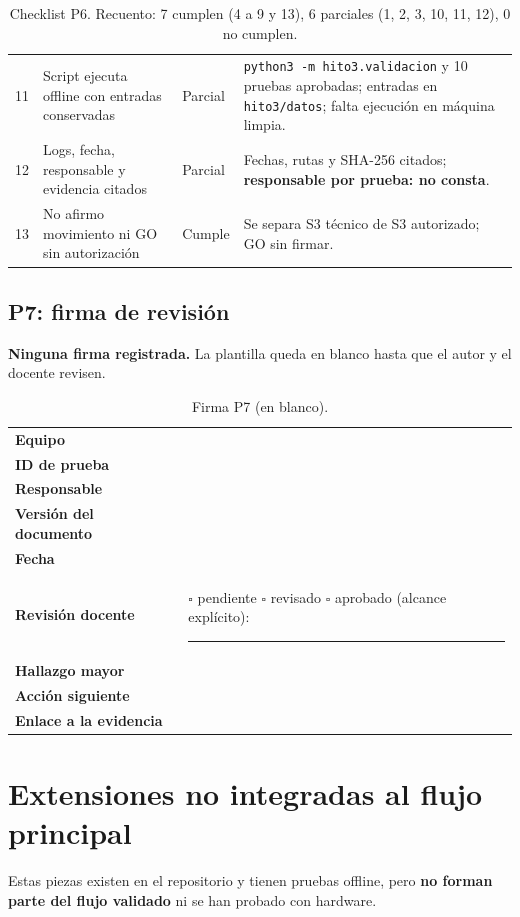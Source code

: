 \documentclass[10pt,a4paper]{article}
\begin{document}
\begin{table}[H]
\begin{tabularx}{\textwidth}{@{}r>{\raggedright\arraybackslash}p{4.6cm}>{\raggedright\arraybackslash}p{1.5cm}>{\raggedright\arraybackslash}X@{}}
11 & Script ejecuta offline con entradas conservadas & Parcial & \texttt{python3 -m hito3.validacion} y 10 pruebas aprobadas; entradas en \texttt{hito3/datos}; falta ejecución en máquina limpia.\\
12 & Logs, fecha, responsable y evidencia citados & Parcial & Fechas, rutas y SHA-256 citados; \textbf{responsable por prueba: no consta}.\\
13 & No afirmo movimiento ni GO sin autorización & Cumple & Se separa S3 técnico de S3 autorizado; GO sin firmar.\\
\bottomrule
\end{tabularx}
\caption{Checklist P6. Recuento: 7 cumplen (4 a 9 y 13), 6 parciales (1, 2, 3, 10, 11, 12), 0 no cumplen.}
\end{table}

\subsection{P7: firma de revisión}
\label{sec:p7}
\textbf{Ninguna firma registrada.} La plantilla queda en blanco hasta que el autor y el docente revisen.

\begin{table}[H]
\centering\small
\renewcommand{\arraystretch}{1.5}
\begin{tabularx}{\textwidth}{@{}>{\bfseries}p{4.2cm}X@{}}
\toprule
Equipo & \\
ID de prueba & \\
Responsable & \\
Versión del documento & \\
Fecha & \\
Revisión docente & $\square$ pendiente \quad $\square$ revisado \quad $\square$ aprobado (alcance explícito): \rule{4cm}{0.3pt}\\
Hallazgo mayor & \\
Acción siguiente & \\
Enlace a la evidencia & \\
\bottomrule
\end{tabularx}
\caption{Firma P7 (en blanco).}
\end{table}

\section{Extensiones no integradas al flujo principal}
\label{sec:ext}

Estas piezas existen en el repositorio y tienen pruebas offline, pero \textbf{no forman parte del flujo validado} ni se han probado con hardware.
\end{document}
